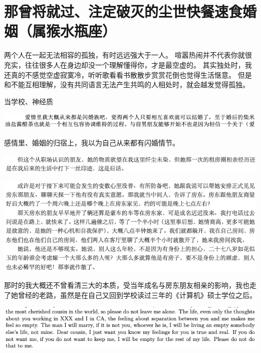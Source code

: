 \documentclass[9pt, b5paper]{article}
\begin{document}
\section{那曾将就过、注定破灭的尘世快餐速食婚姻（属猴水瓶座）}
\label{sec:org515b0b7}
两个人在一起无法相容的孤独，有时远远强大于一人。
喧嚣热闹并不代表你就很充实，往往很多人在身边却没一个理解懂得你，才是最空虚的。
其实独处时，我还真的不感觉空虚寂寞冷，听听歌看看书散散步赏赏花倒也觉得生活惬意。
但是和不能互相理解，没有共同语言无法产生共鸣的人相处时，就会越发觉得孤独。

当学校、神经质

\begin{center}
\includegraphics[width=.9\linewidth]{./pic/backups_plans_20210423_203401.png}
\end{center}

感情里、婚姻的归宿上，我以为自己从来都有闪婚情节。

\begin{center}
\includegraphics[width=.9\linewidth]{./pic/backups_plans_20210423_204215.png}
\end{center}

\begin{center}
\includegraphics[width=.9\linewidth]{./pic/backups_plans_20210423_204134.png}
\end{center}

那时的我大概还不曾看清三大的本质，受当年成名与房东朋友相亲的影响，我也走了她曾经的老路，虽然是在自己又回到学校读过三年的《计算机》硕士学位之后。

\begin{center}
\includegraphics[width=.9\linewidth]{./pic/backups_plans_20210423_201706.png}
\end{center}
\end{document}
